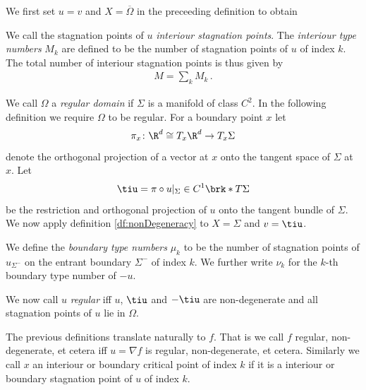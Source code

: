We first set $u=v$ and $X=\overline{\Omega}$ in the preceeding definition to obtain
\begin{definition}
  We call the stagnation points of $u$ \emph{interiour stagnation points}.
  The \emph{interiour type numbers} $M_k$ are defined to be
  the number of stagnation points of $u$ of index $k$.
  The total number of interiour stagnation points is thus given by
  \begin{align*}
    M=\sum_kM_k\,.
  \end{align*}
\end{definition}

We call $\Omega$ a \emph{regular domain} if $\Sigma$ is a manifold of class $C^2$.
In the following definition we require $\Omega$ to be regular.
For a boundary point $x$ let $$\pi_x\colon \R^d\cong T_x\R^d\to T_x\Sigma$$ denote the orthogonal projection of a
vector at $x$ onto the tangent space of $\Sigma$ at $x$.
Let 
\begin{align}
  \tiu=\pi\circ u\vert_{\Sigma}\in C^1\brk*{T\Sigma}\label{eq:definitions:projectionSigma}
\end{align}
be the restriction and orthogonal projection of $u$ onto the tangent bundle of $\Sigma$.
We now apply definition \ref{df:nonDegeneracy} to $X=\Sigma$ and $v=\tiu$.
\begin{definition}\label{df:bdTypeNbrs}
  We define the \emph{boundary type numbers} $\mu_k$ to be
  the number of stagnation points of $u_{\Sigma^-}$ on the entrant boundary
  $\Sigma^-$ of index $k$.
  We further write $\nu_k$ for the $k$-th boundary type number of $-u$.
\end{definition}

We now call $u$ \emph{regular} iff $u$, $\tiu$ and $-\tiu$ are non-degenerate and all stagnation points of $u$ lie in $\Omega$.

The previous definitions translate naturally to $f$.
That is we call $f$ regular, non-degenerate, et cetera iff $u=\nabla f$ is regular, non-degenerate, et cetera.
Similarly we call $x$ an interiour or boundary critical point of index $k$ if it is a interiour or
boundary stagnation point of $u$ of index $k$.


